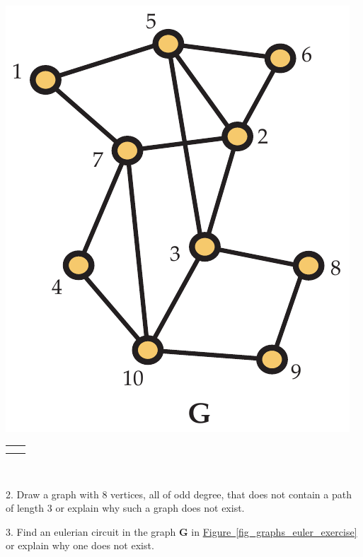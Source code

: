 \documentclass[10pt,]{book}
\theoremstyle{plain}
\theoremstyle{definition}
\theoremstyle{definition}
\theoremstyle{definition}
\theoremstyle{definition}
\numberwithin{equation}{section}
\newlength{\panelmax}
\newcommand{\bfG}{\mathbf{G}}
\begin{document}
\begin{exerciselist}
{\begin{lrbox}{\panelboxAimage}
\includegraphics[width=0.35\linewidth]{images/graph_ex}
\end{lrbox}
\ifdefined\phAimage\else\newlength{\phAimage}\fi%
\setlength{\phAimage}{\ht\panelboxAimage+\dp\panelboxAimage}
\settototalheight{\phAimage}{\usebox{\panelboxAimage}}
\setlength{\panelmax}{\maxof{\panelmax}{\phAimage}}
\leavevmode%
\setlength{\tabcolsep}{0.0125\linewidth}
\par\medskip\noindent
\hspace*{0.0125\linewidth}%
\begin{tabular}{@{}*{2}{c}@{}}
\begin{minipage}[c][\panelmax][t]{0.6\linewidth}\usebox{\panelboxAol}\end{minipage}&
\begin{minipage}[c][\panelmax][t]{0.35\linewidth}\usebox{\panelboxAimage}\end{minipage}\tabularnewline
&
\parbox[t]{0.35\linewidth}{
}\end{tabular}\\
}%
\par\smallskip
\item[2.]\hypertarget{exercise-10}{}\hypertarget{p-155}{}%
Draw a graph with \(8\) vertices, all of odd degree, that does not contain a path of length \(3\) or explain why such a graph does not exist.%
\par\smallskip
\item[3.]\hypertarget{exercise-11}{}\hypertarget{p-156}{}%
Find an eulerian circuit in the graph \(\bfG\) in \hyperref[fig_graphs_euler_exercise]{Figure~\ref{fig_graphs_euler_exercise}} or explain why one does not exist.%
\begin{figure}

\end{figure}
\end{exerciselist}
\end{document}
